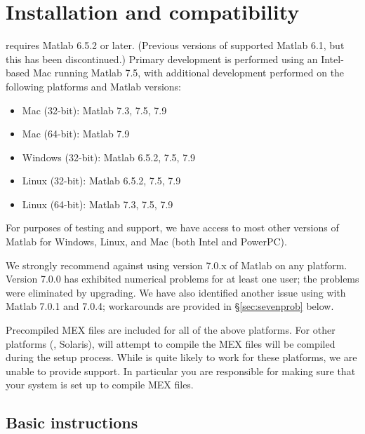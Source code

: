 \documentclass[12pt]{article}
\begin{document}
\newpage
\appendix

\section{Installation and compatibility}
\label{s-installing}

\cvx requires Matlab 6.5.2 or later. (Previous
versions of \cvx supported Matlab 6.1, but this has been 
discontinued.) Primary \cvx development is performed using
an Intel-based Mac running Matlab 7.5, with additional
development performed on the following platforms and Matlab versions:
\begin{itemize}
\item Mac (32-bit): Matlab 7.3, 7.5, 7.9
\item Mac (64-bit): Matlab 7.9
\item Windows (32-bit): Matlab 6.5.2, 7.5, 7.9
\item Linux (32-bit): Matlab 6.5.2, 7.5, 7.9
\item Linux (64-bit): Matlab 7.3, 7.5, 7.9
\end{itemize}
For purposes of testing and support, we have access to most
other versions of Matlab for Windows, Linux, and Mac (both
Intel and PowerPC). 

We strongly recommend against using version 7.0.x of Matlab
on any platform. Version 7.0.0 has exhibited numerical problems for at least one user;
the problems were eliminated by upgrading.
We have also identified another issue using \cvx
with Matlab 7.0.1 and 7.0.4; workarounds
are provided in \S\ref{sec:sevenprob} below.

Precompiled MEX files are included for all of the above platforms.
For other platforms (\eg, Solaris), \cvx will attempt to compile 
the MEX files will be compiled during the setup
process. While \cvx is quite likely to work for
these platforms, we are unable to provide support. In particular
you are responsible for making sure that your system is
set up to compile MEX files.

\subsection{Basic instructions}
\label{sec:winlin}
\end{document}
